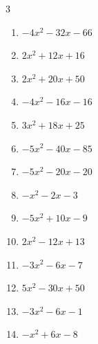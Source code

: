 \begin{multicols}{3}
\begin{enumerate}
  \item $-4x^{2}-32x-66$


  \item $2x^{2}+12x+16$


  \item $2x^{2}+20x+50$


  \item $-4x^{2}-16x-16$


  \item $3x^{2}+18x+25$


  \item $-5x^{2}-40x-85$


  \item $-5x^{2}-20x-20$


\columnbreak %

  \item $-x^{2}-2x-3$


  \item $-5x^{2}+10x-9$


  \item $2x^{2}-12x+13$


  \item $-3x^{2}-6x-7$


  \item $5x^{2}-30x+50$


  \item $-3x^{2}-6x-1$


  \item $-x^{2}+6x-8$


\end{enumerate}
\end{multicols}

